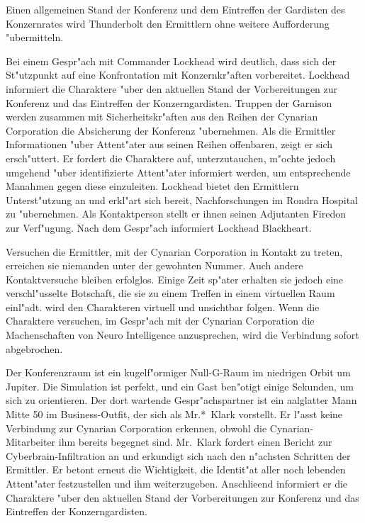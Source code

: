Einen allgemeinen Stand der Konferenz und dem Eintreffen der Gardisten des Konzernrates wird Thunderbolt den Ermittlern ohne weitere Aufforderung "ubermitteln.

Bei einem Gespr"ach mit Commander Lockhead wird deutlich, dass sich der St"utzpunkt auf eine Konfrontation mit Konzernkr"aften vorbereitet. Lockhead informiert die Charaktere "uber den aktuellen Stand der Vorbereitungen zur Konferenz und das Eintreffen der Konzerngardisten. Truppen der Garnison werden zusammen mit Sicherheitskr"aften aus den Reihen der Cynarian Corporation die Absicherung der Konferenz "ubernehmen. Als die Ermittler Informationen "uber Attent"ater aus seinen Reihen offenbaren, zeigt er sich ersch"uttert. Er fordert die Charaktere auf, unterzutauchen, m"ochte jedoch umgehend "uber identifizierte Attent"ater informiert werden, um entsprechende Ma\3nahmen gegen diese einzuleiten. Lockhead bietet den Ermittlern Unterst"utzung an und erkl"art sich bereit, Nachforschungen im Rondra Hospital zu "ubernehmen. Als Kontaktperson stellt er ihnen seinen Adjutanten Firedon zur Verf"ugung. Nach dem Gespr"ach informiert Lockhead Blackheart.

Versuchen die Ermittler, mit der Cynarian Corporation in Kontakt zu treten, erreichen sie niemanden unter der gewohnten Nummer. Auch andere Kontaktversuche bleiben erfolglos. Einige Zeit sp"ater erhalten sie jedoch eine verschl"usselte Botschaft, die sie zu einem Treffen in einem virtuellen Raum einl"adt. \xl{} wird den Charakteren virtuell und unsichtbar folgen. Wenn die Charaktere versuchen, im Gespr"ach mit der Cynarian Corporation die Machenschaften von Neuro Intelligence anzusprechen, wird die Verbindung sofort abgebrochen.

Der Konferenzraum ist ein kugelf"ormiger Null-G-Raum im niedrigen Orbit um Jupiter. Die Simulation ist perfekt, und ein Gast ben"otigt einige Sekunden, um sich zu orientieren. Der dort wartende Gespr"achspartner ist ein aalglatter Mann Mitte 50 im Business-Outfit, der sich als Mr.*~Klark vorstellt. Er l"asst keine Verbindung zur Cynarian Corporation erkennen, obwohl die Cynarian-Mitarbeiter ihm bereits begegnet sind. Mr.~Klark fordert einen Bericht zur Cyberbrain-Infiltration an und erkundigt sich nach den n"achsten Schritten der Ermittler. Er betont erneut die Wichtigkeit, die Identit"at aller noch lebenden Attent"ater festzustellen und ihm weiterzugeben. Anschlie\3end informiert er die Charaktere "uber den aktuellen Stand der Vorbereitungen zur Konferenz und das Eintreffen der Konzerngardisten.

